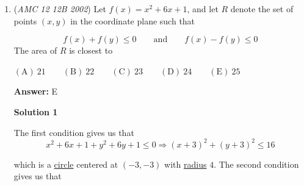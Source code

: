 \begin{enumerate}
 By the \href{https://artofproblemsolving.com/wiki/index.php?title=Pythagorean\_Theorem}{Pythagorean Theorem},  
 \begin{align*} AB = \sqrt{PA^2 + PB^2} & = \sqrt{24^2 + 32^2} = 40\\ BC = \sqrt{PB^2 + PC^2} & = \sqrt{32^2 + 28^2} = 4\sqrt{113}\\ CD = \sqrt{PC^2 + PD^2} & = \sqrt{28^2 + 45^2} = 53\\ DA = \sqrt{PD^2 + PA^2} & = \sqrt{45^2 + 24^2} = 51 \end{align*}


 The perimeter of $ABCD$ is $AB + BC + CD + DA = 4(36 + \sqrt{113}) \Rightarrow \mathrm{(E)}$.

 



\textbf{Solution 2}

Draw the diagram out. Notice the very peculiar sets of numbers $(24,32);(24,45);(28,45)$; these are simply multiples of the legs of well-known Pythagorean triples $(3,4,5);(8,15,17);(28,45,53)$, pointing to signs of possible right angles. We can assume that $\angle APB=\angle BPC=\angle CPD=\angle DPA=90^\circ$, so the area of the entire figure would be:

 
 \[A=\frac{1}{2}\cdot(24+28)(45+32)=\frac{1}{2}\cdot52\cdot77=2002\]

 Thus this is the correct case, so finding the side lengths of $ABCD$ by the Pythagorean Theorem yields $AB=40$, $BC=4\sqrt{113}$,$CD=53$,$DA=51$, so the perimeter is $40+4\sqrt{130}+53+51=144+4\sqrt{130}=\boxed{\textbf{(E) }4(36+\sqrt{113})}$.

 


	\item (\textit{AMC 12 12B 2002}) Let $f(x) = x^2 + 6x + 1$, and let $R$ denote the set of points $(x,y)$ in the coordinate plane such that 

 \[f(x) + f(y) \le 0 \qquad \text{and} \qquad f(x)-f(y) \le 0\]
The area of $R$ is closest to 


 $\mathrm{(A)}\ 21 \qquad\mathrm{(B)}\ 22 \qquad\mathrm{(C)}\ 23 \qquad\mathrm{(D)}\ 24 \qquad\mathrm{(E)}\ 25$

 \textbf{Answer: }E



\textbf{Solution 1}

The first condition gives us that
 \[x^2 + 6x + 1 + y^2 + 6y + 1 \le 0 \Longrightarrow (x+3)^2 + (y+3)^2 \le 16\]

 which is a \href{https://artofproblemsolving.com/wiki/index.php?title=Circle}{circle} centered at $(-3,-3)$ with \href{https://artofproblemsolving.com/wiki/index.php?title=Radius}{radius} $4$. The second condition gives us that 


\end{enumerate}
